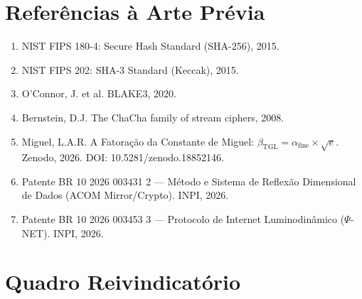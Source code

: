\documentclass[12pt,a4paper]{article}
\newcommand{\betatgl}{\beta_{\!\scriptscriptstyle\mathrm{TGL}}}
\newcommand{\afine}{\alpha_{\mathrm{fine}}}
\begin{document}
\section{Referências à Arte Prévia}

\begin{enumerate}[nosep]
\item NIST FIPS 180-4: Secure Hash Standard (SHA-256), 2015.
\item NIST FIPS 202: SHA-3 Standard (Keccak), 2015.
\item O'Connor, J. et al. BLAKE3, 2020.
\item Bernstein, D.J. The ChaCha family of stream ciphers, 2008.
\item Miguel, L.A.R. A Fatoração da Constante de Miguel: $\betatgl = \afine \times \sqrt{e}$. Zenodo, 2026. DOI: 10.5281/zenodo.18852146.
\item Patente BR 10 2026 003431 2 --- Método e Sistema de Reflexão Dimensional de Dados (ACOM Mirror/Crypto). INPI, 2026.
\item Patente BR 10 2026 003453 3 --- Protocolo de Internet Luminodinâmico ($\Psi$-NET). INPI, 2026.
\end{enumerate}


\newpage
\section*{Quadro Reivindicatório}
\end{document}
